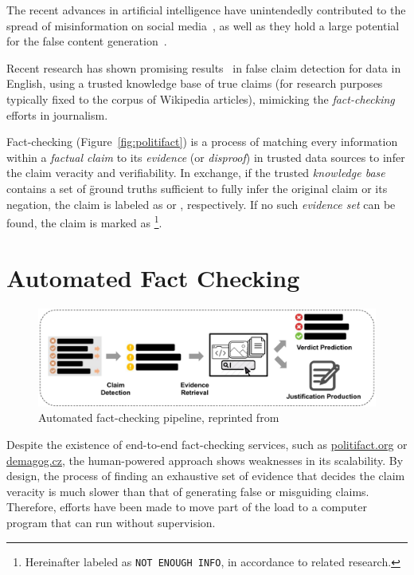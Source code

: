 The recent advances in artificial intelligence have unintendedly contributed to the spread of misinformation on social media~\cite{doi:10.1177/2056305119888654}, as well as they hold a large potential for the false content generation~\cite{glorin}.

Recent research has shown promising results~\cite{fever2} in false claim detection for data in English, using a trusted knowledge base of true claims (for research purposes typically fixed to the corpus of \textsf{Wikipedia} articles), mimicking the \textit{fact-checking} efforts in journalism.

Fact-checking (Figure~\ref{fig:politifact}) is a process of matching every information within a \textit{factual claim} to its \textit{evidence} (or \textit{disproof}) in trusted data sources to infer the claim veracity and verifiability. In exchange, if the trusted \textit{knowledge base} contains a set of \"{ground truths} sufficient to fully infer the original claim or its negation, the claim is labeled as {} or {}, respectively. If no such \textit{evidence set} can be found, the claim is marked as {}\footnote{Hereinafter labeled as \texttt{NOT ENOUGH INFO}, in accordance to related research.}.


\section{Automated Fact Checking}

\begin{figure}
    \includegraphics[width=14cm]{fig/framework.pdf}
    \caption{Automated fact-checking pipeline, reprinted from~\cite{guo-etal-2022-survey}}
    \label{fig:framework}
\end{figure}

Despite the existence of end-to-end fact-checking services, such as \url{politifact.org} or \url{demagog.cz}, the human-powered approach shows weaknesses in its scalability. By design, the process of finding an exhaustive set of evidence that decides the claim veracity is much slower than that of generating false or misguiding claims. Therefore, efforts have been made to move part of the load to a computer program that can run without supervision.

